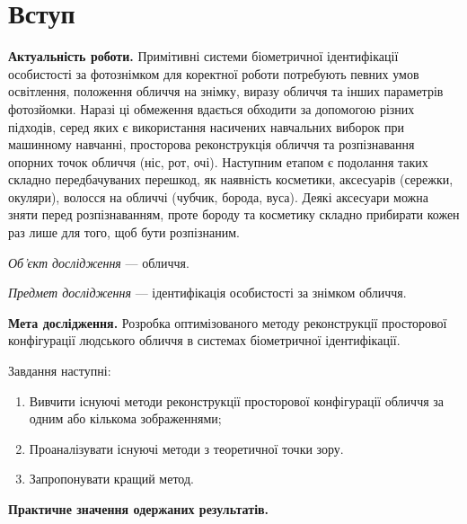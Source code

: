 \chapter*{Вступ}

\textbf{Актуальність роботи.}
Примітивні системи біометричної ідентифікації особистості за фотознімком
для коректної роботи потребують певних умов
освітлення, положення обличчя на знімку, виразу обличчя
та інших параметрів фотозйомки.
Наразі ці обмеження вдається обходити за допомогою різних підходів,
серед яких є
використання насичених навчальних виборок при машинному навчанні,
просторова реконструкція обличчя та
розпізнавання опорних точок обличчя (ніс, рот, очі).
Наступним етапом є подолання таких складно передбачуваних перешкод,
як наявність косметики, аксесуарів (сережки, окуляри),
волосся на обличчі (чубчик, борода, вуса).
Деякі аксесуари можна зняти перед розпізнаванням,
проте бороду та косметику складно прибирати кожен раз лише для того,
щоб бути розпізнаним.

\textit{Об’єкт дослідження} --- обличчя.

\textit{Предмет дослідження} --- ідентифікація особистості за знімком обличчя.

\textbf{Мета дослідження.}
Розробка оптимізованого методу реконструкції просторової конфігурації
людського обличчя в системах біометричної ідентифікації.

Завдання наступні:
\begin{enumerate}
  \item
    Вивчити існуючі методи реконструкції просторової конфігурації обличчя
    за одним або кількома зображеннями;
  \item
    Проаналізувати існуючі методи з теоретичної точки зору.
  \item
    Запропонувати кращий метод.
\end{enumerate}

\textbf{Практичне значення одержаних результатів.}
